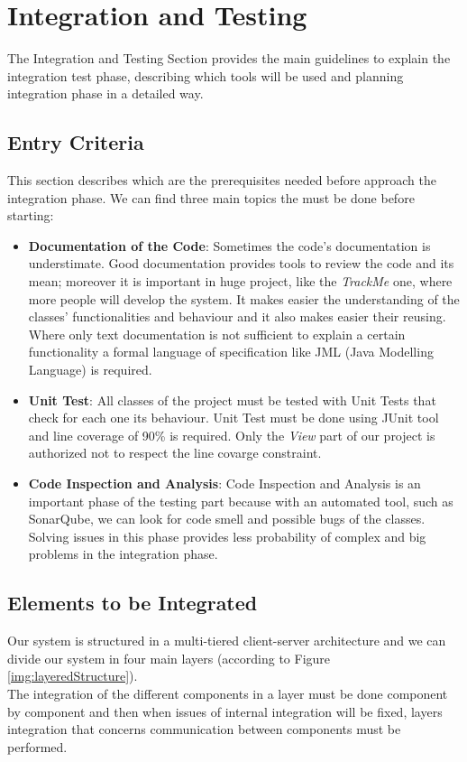 
\section{Integration and Testing}\label{int_test}
The Integration and Testing Section provides the main guidelines to explain the integration test phase, describing which tools will be used and planning integration phase in a detailed way.

\subsection{Entry Criteria}
This section describes which are the prerequisites needed before approach the integration phase. We can find three main topics the must be done before starting:
\begin{itemize}
  \item \textbf{Documentation of the Code}: Sometimes the code's documentation is understimate. Good documentation provides tools to review the code and its mean; moreover it is important in huge project, like the \textit{TrackMe} one, where more people will develop the system. It makes easier the understanding of the classes' functionalities and behaviour and it also makes easier their reusing.\\
  Where only text documentation is not sufficient to explain a certain functionality a formal language of specification like JML (Java Modelling Language) is required.
  \item \textbf{Unit Test}: All classes of the project must be tested with Unit Tests that check for each one its behaviour. Unit Test must be done using JUnit tool and line coverage of 90\% is required. Only the \textit{View} part of our project is authorized not to respect the line covarge constraint.
  \item \textbf{Code Inspection and Analysis}: Code Inspection and Analysis is an important phase of the testing part because with an automated tool, such as SonarQube, we can look for code smell and possible bugs of the classes. Solving issues in this phase provides less probability of complex and big problems in the integration phase.
\end{itemize}

\subsection{Elements to be Integrated}
Our system is structured in a multi-tiered client-server architecture and we can divide our system in four main layers (according to Figure \ref{img:layeredStructure}).\\
The integration of the different components in a layer must be done component by component and then when issues of internal integration will be fixed, layers integration that concerns communication between components must be performed.

